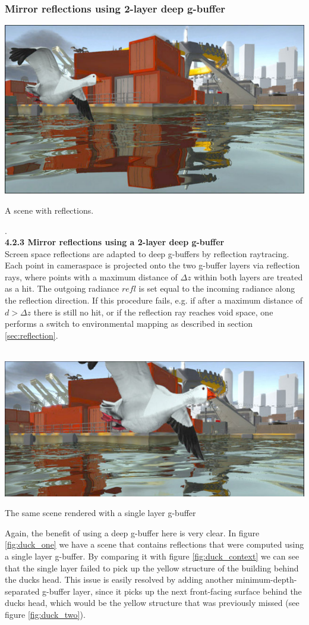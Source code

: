 \documentclass{ACGSeminar}
\begin{document}
	\subsubsection{Mirror reflections using 2-layer deep g-buffer}
		\begin{floatingfigure}[r]{.5\textwidth} %
			\includegraphics[width=.5\textwidth]{img/duck_context.png} %
			\caption{A scene with reflections.}%
			\label{fig:duck_context}%
		\end{floatingfigure} %
		. \\
		\textbf{4.2.3 \quad Mirror reflections using a 2-layer deep g-buffer} \\
		Screen space reflections are adapted to deep g-buffers by reflection raytracing. Each point in cameraspace is projected onto the two g-buffer layers via reflection rays, where points with a maximum distance of $\Delta z$ within both layers are treated as a hit. The outgoing radiance $refl$ is set equal to the incoming radiance along the reflection direction. If this procedure fails, e.g. if after a maximum distance of $d > \Delta z$ there is still no hit, or if the reflection ray reaches void space, one performs a switch to environmental mapping as described in section \ref{sec:reflection}. \\\\
		\begin{floatingfigure}[r]{.5\textwidth} %
			\includegraphics[width=.5\textwidth]{img/duck_one.png} %
			\caption{The same scene rendered with a single layer g-buffer}%
			\label{fig:duck_one}%
		\end{floatingfigure} %
		Again, the benefit of using a deep g-buffer here is very clear. In figure \ref{fig:duck_one} we have a scene that contains reflections that were computed using a single layer g-buffer. By comparing it with figure \ref{fig:duck_context} we can see that the single layer failed to pick up the yellow structure of the building behind the ducks head. This issue is easily resolved by adding another minimum-depth-separated g-buffer layer, since it picks up the next front-facing surface behind the ducks head, which would be the yellow structure that was previously missed (see figure \ref{fig:duck_two}).
\end{document}
